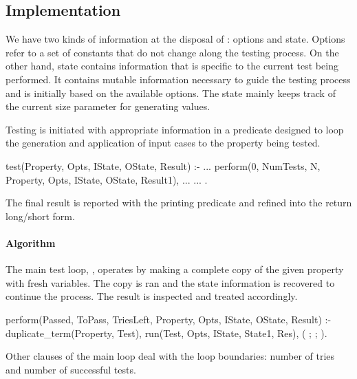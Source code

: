 \subsection{Implementation}


We have two kinds of information at the disposal of \plqc{}: options and
state.
%
Options refer to a set of constants that do not change along the testing
process.%
%
On the other hand, state contains information that is specific to
the current test being performed.
%
It contains mutable information necessary to guide the testing process
and is initially based on the available options.
%
The state mainly keeps track of the current size parameter
for generating values.


Testing is initiated with appropriate information in a predicate
designed to loop the generation and application of input cases to the
property being tested.
%
\begin{yapcode}
 test(Property, Opts,
      IState, OState, Result) :-
   ...
   perform(0, NumTests, N, Property, Opts,
           IState, OState, Result1),
   ...
   ...
 .
\end{yapcode}
%
The final result is reported with the printing predicate and refined
into the return long/short form.


\paragraph{Algorithm}

The main test loop, , operates by making a complete copy
of the given property with fresh variables.
%
The copy is ran and the state information is recovered to continue the
process.
%
The result is inspected and treated accordingly.
%
\begin{yapcode}
 perform(Passed, ToPass, TriesLeft, Property,
         Opts, IState, OState, Result) :-
   duplicate_term(Property, Test),
   run(Test, Opts, IState, State1, Res),
   (
   ;
   ;
   ).
\end{yapcode}
%
%
Other clauses of the main loop deal with the loop boundaries: number of
tries and number of successful tests.


